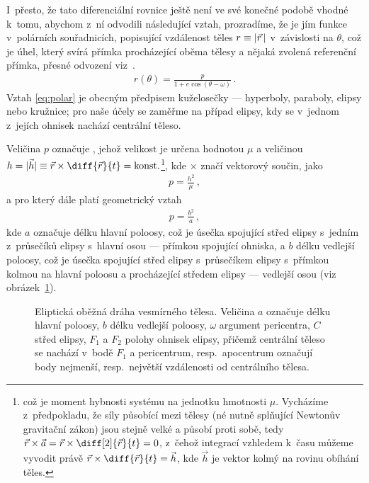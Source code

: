 \documentclass[A4paper, 12pt, oneside]{book}
\begin{document}
I~přesto, že tato diferenciální rovnice ještě není ve své konečné podobě vhodné k~tomu, abychom z~ní odvodili následující vztah, prozradíme, že je jím funkce v~polárních souřadnicích, popisující vzdálenost těles $r\equiv\lvert \vec{r} \,\rvert$ v~závislosti na  $\theta$, což je úhel, který svírá přímka procházející oběma tělesy a nějaká zvolená referenční přímka, přesné odvození viz~\cite{murray00}.
\begin{align} \label{eq:polar}
	r(\theta)=\frac{p}{1+e\cos{(\theta-\omega)}}\,.
\end{align}
Vztah \eqref{eq:polar} je obecným předpisem kuželosečky --- hyperboly, paraboly, elipsy nebo kružnice; pro naše účely se zaměřme na případ elipsy, kdy se v~jednom z~jejích ohnisek nachází centrální těleso.

Veličina $p$ označuje , jehož velikost je určena hodnotou $\mu$ a veličinou~$h=|\vec{h}| \equiv \vec{r}\times\diff{\vec{r}}{t}={\rm konst.}$\footnote{což je  moment hybnosti systému na jednotku hmotnosti $\mu$. Vycházíme z~předpokladu, že síly působící mezi tělesy (né nutně splňující Newtonův gravitační zákon) jsou stejně velké a působí proti sobě, tedy $\vec{r}\times\vec{a}=\vec{r}\times\diff[2]{\vec{r}}{t}=0$, z~čehož integrací vzhledem k~času můžeme vyvodit právě $\vec{r}\times\diff{\vec{r}}{t}=\vec{h}$, kde $\vec{h}$ je vektor kolmý na rovinu obíhání těles.}, kde $\times$ značí vektorový součin, jako
\begin{align}
	p=\frac{h^2}{\mu}\,,
\end{align}
a pro který dále platí geometrický vztah
\begin{align}
	p=\frac{b^2}{a}\,,
\end{align}
kde $a$ označuje délku hlavní poloosy, což je úsečka spojující střed elipsy s~jedním z~průsečíků elipsy s~hlavní osou --- přímkou spojující ohniska, a $b$ délku vedlejší poloosy, což je úsečka spojující střed elipsy s~průsečíkem elipsy s~přímkou kolmou na hlavní poloosu a procházející středem elipsy --- vedlejší osou (viz obrázek~\ref{fig:elip}).

\begin{figure}
	\centering
	\caption{Eliptická oběžná dráha vesmírného tělesa. Veličina $a$ označuje délku hlavní poloosy, $b$ délku vedlejší poloosy, $\omega$ argument pericentra, $C$ střed elipsy, $F_1$ a $F_2$ polohy ohnisek elipsy, přičemž centrální těleso se nachází v~bodě $F_1$ a pericentrum, resp.\ apocentrum označují body nejmenší, resp.\ největší vzdálenosti od centrálního tělesa.} \label{fig:elip}
\end{figure}
\end{document}
